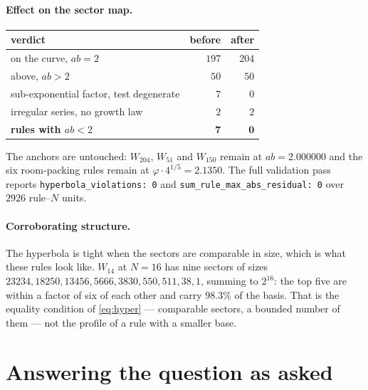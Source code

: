 \documentclass[11pt]{article}
\theoremstyle{plain}
\begin{document}
\paragraph{Effect on the sector map.}
\begin{center}
\begin{tabular}{lrr}
\toprule
verdict & before & after \\
\midrule
on the curve, $ab=2$ & $197$ & $204$ \\
above, $ab>2$ & $50$ & $50$ \\
sub-exponential factor, test degenerate & $7$ & $0$ \\
irregular series, no growth law & $2$ & $2$ \\
\midrule
\textbf{rules with $ab<2$} & $\mathbf{7}$ & $\mathbf{0}$ \\
\bottomrule
\end{tabular}
\end{center}

\noindent The anchors are untouched: $W_{204}$, $W_{51}$ and $W_{150}$ remain at
$ab=2.000000$ and the six room-packing rules remain at
$\varphi\cdot4^{1/5}=2.1350$. The full validation pass reports
\verb|hyperbola_violations: 0| and \verb|sum_rule_max_abs_residual: 0| over
$2926$ rule--$N$ units.

\paragraph{Corroborating structure.} The hyperbola is tight when the sectors are
comparable in size, which is what these rules look like. $W_{14}$ at $N=16$ has nine
sectors of sizes $23234, 18250, 13456, 5666, 3830, 550, 511, 38, 1$, summing to
$2^{16}$: the top five are within a factor of six of each other and carry $98.3\%$
of the basis. That is the equality condition of \eqref{eq:hyper} --- comparable
sectors, a bounded number of them --- not the profile of a rule with a smaller
base.

\section{Answering the question as asked}
\end{document}

